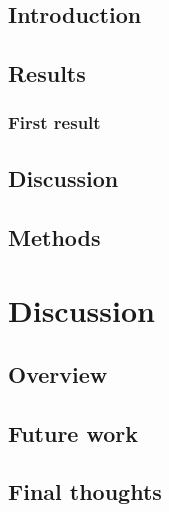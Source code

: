     \section{Introduction}
    \label{sec:ch3_intro}
    

    \section{Results}
        \subsection{First result}
        \label{sec:ch3_result1}
        

    \section{Discussion}
    \label{sec:ch3_discussion}
    

    \section{Methods}
    \label{sec:ch3_methods}
    
\newpage

\chapter{Discussion}
\label{ch:ch4_discussion}
    \section{Overview}
    
    \label{sec:ch4_overview}
    \section{Future work}
    
    \label{sec:ch4_future_work}
    \section{Final thoughts}
    
    \label{sec:ch4_final_thoughts}
\newpage

%
\begin{singlespace}
  
  
\end{singlespace}


